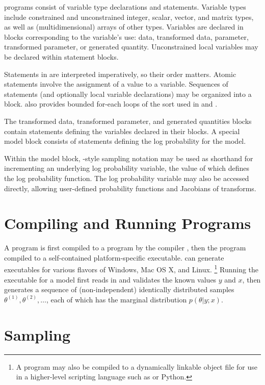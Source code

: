 \Stan programs consist of variable type declarations and statements.
Variable types include constrained and unconstrained integer, scalar,
vector, and matrix types, as well as (multidimensional) arrays of
other types.  Variables are declared in blocks corresponding to the
variable's use: data, transformed data, parameter, transformed
parameter, or generated quantity.  Unconstrained local variables may
be declared within statement blocks.

Statements in \Stan are interpreted imperatively, so their order
matters.  Atomic statements involve the assignment of a value to a
variable.  Sequences of statements (and optionally local variable
declarations) may be organized into a block.  \Stan also provides bounded
for-each loops of the sort used in \R and \BUGS.

The transformed data, transformed parameter, and generated quantities
blocks contain statements defining the variables declared in their
blocks.  A special model block consists of statements defining the log
probability for the model.

Within the model block, \BUGS-style sampling notation may be used as
shorthand for incrementing an underlying log probability variable, the
value of which defines the log probability function.  The log
probability variable may also be accessed directly, allowing
user-defined probability functions and Jacobians of transforms.


\section{Compiling and Running \Stan Programs}

A \Stan program is first compiled to a \Cpp program by the \Stan
compiler \stanc, then the \Cpp program compiled to a self-contained
platform-specific executable.  \Stan can generate executables for
various flavors of Windows, Mac OS X, and Linux.%
%
\footnote{A \Stan program may also be compiled to a dynamically
  linkable object file for use in a higher-level scripting language
  such as \R or Python.}
%
Running the \Stan executable for a model first reads in and validates
the known values $y$ and $x$, then generates a sequence of
(non-independent) identically distributed samples $\theta^{(1)},
\theta^{(2)}, \ldots$, each of which has the marginal distribution
$p(\theta|y;x)$.


\section{Sampling}

